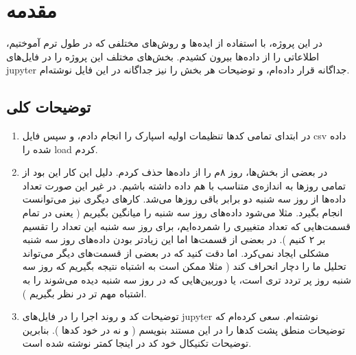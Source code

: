 \section{مقدمه}
در این پروژه، با استفاده از ایده‌ها و روش‌های مختلفی که در طول ترم آموختیم، 
اطلاعاتی را از داده‌ها بیرون کشیدم. بخش‌های مختلف این پروژه را در فایل‌های 
jupyter
جداگانه قرار داده‌ام، و توضیحات هر بخش را نیز جداگانه در این فایل نوشته‌‌ام. 


\subsection{توضیحات کلی}

\begin{enumerate}
	\item 
	در ابتدای تمامی کدها تنظیمات اولیه اسپارک را انجام دادم، و سپس فایل 
	csv
	داده شده را 
	load
	کردم. 

	\item 
	در بعضی از بخش‌ها، روز ۸م را از داده‌ها حذف کردم. دلیل این کار این بود از تمامی روز‌ها
	به اندازه‌ی متناسب با هم داده داشته باشیم. در غیر این صورت تعداد داده‌ها از روز سه شنبه 
	دو برابر باقی روز‌ها می‌شد. کار‌های دیگری نیز می‌توانست انجام بگیرد. مثلا می‌شود داده‌های روز سه شنبه را 
	میانگین بگیریم (
		یعنی در تمام قسمت‌هایی که تعداد متغییری را شمر‌ده‌ایم، برای روز سه شنبه این تعداد را 
		تقسیم بر ۲ کنیم
	). 
	در بعضی از قسمت‌ها اما این زیادتر بودن داده‌های روز سه شنبه مشکلی ایجاد نمی‌کرد. اما دقت 
	کنید که در بعضی‌ از قسمت‌های دیگر می‌تواند تحلیل ما را دچار انحراف کند (
		مثلا ممکن است به اشتباه نتیجه‌ بگیریم که روز سه شنبه روز پر تردد تری است، یا 
		دوربین‌هایی که در روز سه شنبه دیده‌ می‌شوند را به اشتباه مهم تر در نظر بگیریم
	). 

	\item 
	توضیحات کد و روند اجرا را در فایل‌های 
	jupyter
	نوشته‌ام. سعی کرده‌ام که توضیحات منطق پشت کد‌ها را در این مستند بنویسم (
		و نه در خود کد‌ها
	). 
	بنابرین توضیحات تکنیکال خود کد در اینجا کمتر نوشته شده است. 
\end{enumerate}


